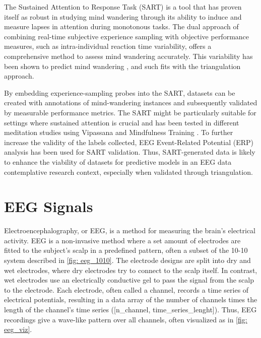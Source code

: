 The Sustained Attention to Response Task (SART) is a tool that has proven itself as robust in studying mind wandering through its ability to induce and measure lapses in attention during monotonous tasks\cite{Robertson1997}. The dual approach of combining real-time subjective experience sampling with objective performance measures, such as intra-individual reaction time variability, offers a comprehensive method to assess mind wandering accurately. This variability has been shown to predict mind wandering \cite{Baird2012}\cite{BastianSackur2013}, and such fits with the triangulation approach. 

By embedding experience-sampling probes into the SART,  datasets can be created with annotations of mind-wandering instances and subsequently validated by measurable performance metrics. The SART might be particularly suitable for settings where sustained attention is crucial and has been tested in different meditation studies using Vipassana\cite{Zanesco2013} and Mindfulness Training \cite{Morrison2014}. To further increase the validity of the labels collected, EEG Event-Related Potential (ERP) analysis has been used for SART validation\cite{Kam2011}. Thus, SART-generated data is likely to enhance the viability of datasets for predictive models in an EEG data contemplative research context, especially when validated through triangulation. 

\section{EEG Signals}
Electroencephalography, or EEG, is a method for measuring the brain's electrical activity. EEG is a non-invasive method where a set amount of electrodes are fitted to the subject's scalp in a predefined pattern, often a subset of the 10-10 system described in \autoref{fig: eeg_1010}. The electrode designs are split into dry and wet electrodes, where dry electrodes try to connect to the scalp itself. In contrast, wet electrodes use an electrically conductive gel to pass the signal from the scalp to the electrode. Each electrode, often called a channel, records a time series of electrical potentials, resulting in a data array of the number of channels times the length of the channel's time series ([n\_channel, time\_series\_lenght]). Thus, EEG recordings give a wave-like pattern over all channels, often visualized as in \autoref{fig: eeg_viz}.

